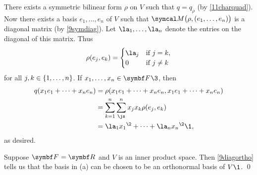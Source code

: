 \proof
\begin{subtheorem}
\item
There exists a symmetric bilinear form $\rho$ on $V$ such that $q = q_\rho$ (by \ref{11charquad}). Now there exists a basis
$e_1, \ldots, e_n$ of $V$ such that $\M\paren[\big]{ \rho, (e_1, \ldots, e_n) }$ is a diagonal matrix (by \ref{9symdiag}).
Let $\la_1, \ldots, \la_n$ denote the entries on the diagonal of this matrix. Thus
\[
\rho(e_j, e_k) = \begin{cases}
\la_j & \text{if } j = k,\\
0 & \text{if } j \ne k
\end{cases}
\]
for all $j, k \in \{1, \ldots, n\}$. If $x_1, \ldots, x_n \in \F{}\3$, then
\begin{align*}
q( x_1 e_1 + \cdots + x_n e_n ) &= \rho( x_1 e_1 + \cdots + x_n e_n, x_1 e_1 + \cdots + x_n e_n ) \\
&= \sum_{k=1}^n \sum_{\js}^n x_j x_k \rho(e_j, e_k) \\
&= \la_1 {x_1}^{\2} + \cdots + \la_n {x_n}^{\2}\1,
\end{align*}
as desired.

\item
Suppose $\F{} = \R{}$ and $V$ is an inner product space. Then \ref{9diagortho} tells us that the basis in (a) can be chosen to be an orthonormal basis of $V\1$.
\qed
\end{subtheorem}

\pagebreak[3]

